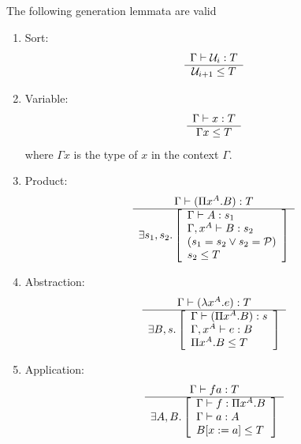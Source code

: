 \begin{theorem}
    \label{GenerationLemma}
    The following generation lemmata are valid
    \begin{enumerate}
    \item Sort:
        $$
        \begin{array}{c} 
            \Gamma \vdash {\cal U}_i : T
         \\ \hline 
            {\cal U}_{i+1} \le T
        \end{array}
        $$

    \item Variable:
        $$
        \begin{array}{c} 
            \Gamma \vdash x : T
         \\ \hline 
            \Gamma x \le T
        \end{array}
        $$
        where $\Gamma x$ is the type of $x$ in the context $\Gamma$.

    \item Product:
        $$
        \begin{array}{c} 
            \Gamma \vdash (\Pi x^A. B) : T
         \\ \hline 
            \exists
                s_1, s_2.
                \left[
                \begin{array}{l}
                    \Gamma \vdash A: s_1
                    \\
                    \Gamma, x^A \vdash B: s_2
                    \\
                    (s_1 = s_2 \lor s_2 = {\cal P})
                    \\
                    s_2 \le T
                \end{array}
                \right]
        \end{array}
        $$

    \item Abstraction:
        $$
        \begin{array}{c} 
            \Gamma \vdash (\lambda x^A. e) : T
         \\ \hline 
            \exists
                B, s.
                \left[
                \begin{array}{l}
                    \Gamma \vdash (\Pi x^A. B): s
                    \\
                    \Gamma, x^A \vdash e: B
                    \\
                    \Pi x^A.B \le T
                \end{array}
                \right]
        \end{array}
        $$

    \item Application:
        $$
        \begin{array}{c} 
            \Gamma \vdash f a : T
         \\ \hline 
            \exists
                A, B.
                \left[
                \begin{array}{l}
                    \Gamma \vdash f: \Pi x^A. B
                    \\
                    \Gamma \vdash a: A
                    \\
                    B[x:=a] \le T
                \end{array}
                \right]
        \end{array}
        $$
    \end{enumerate}


\end{theorem}
